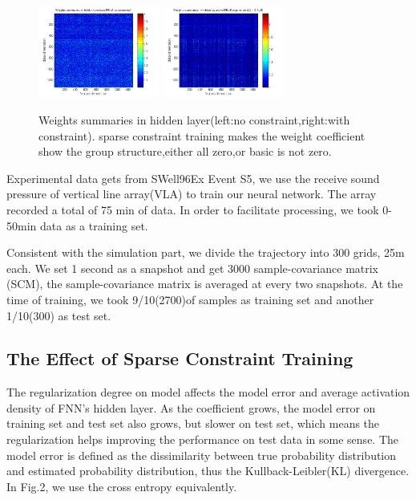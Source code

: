 \begin{figure}
\includegraphics[width=4cm,height=3cm]{figure/Weights_summaries_in_hidden_laye_swell_exp}
\includegraphics[width=4cm,height=3cm]{figure/Weights_summaries_in_hidden_layer_swell_exp_lambda_2_dot_1e_neg_5}
\caption{Weights summaries in hidden layer(left:no constraint,right:with constraint). sparse constraint
training makes the weight coefficient show the group structure,either all zero,or basic is not zero.}
\end{figure}

Experimental data gets from SWell96Ex Event S5, we use the receive sound pressure of vertical line array(VLA) to train our neural network. The array recorded a total of 75 min of data. In order to facilitate processing, we took 0\--50min data as a training set.

Consistent with the simulation part, we divide the trajectory into 300 grids, 25m each. We set 1 second as a snapshot and get 3000 sample-covariance matrix (SCM), the sample-covariance matrix is averaged at every two snapshots.
At the time of training, we took 9/10(2700)of samples as training set and another 1/10(300) as test set.

\subsection{The Effect of Sparse Constraint Training}
The regularization degree on model affects the model error and average activation density of FNN's hidden layer. As the coefficient grows, the model error on training set and test set also grows, but slower on test set, which means
the regularization helps improving the performance on test data in some sense. The model error is defined as the dissimilarity between true probability distribution and estimated probability distribution, thus the Kullback-Leibler(KL) divergence.
In Fig.2, we use the cross entropy equivalently.

